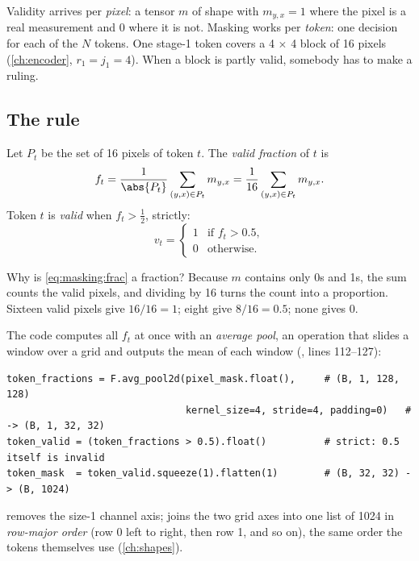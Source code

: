 Validity arrives per \emph{pixel}: a tensor $m$ of shape  with
$m_{y,x} = 1$ where the pixel is a real measurement and $0$ where it is not. Masking works per
\emph{token}: one decision for each of the $N$ tokens. One stage-1 token covers a 4 $\times$ 4 block of
16 pixels (\cref{ch:encoder}, $r_1 = j_1 = 4$). When a block is partly valid, somebody has to make a
ruling.

\subsection{The rule}

\begin{definition}
Let $P_t$ be the set of 16 pixels of token $t$. The \emph{valid fraction} of $t$
is
\begin{equation}\label{eq:masking:frac}
f_t = \frac{1}{\abs{P_t}} \sum_{(y,x) \in P_t} m_{y,x} = \frac{1}{16} \sum_{(y,x) \in P_t} m_{y,x} .
\end{equation}
Token $t$ is \emph{valid} when $f_t > \tfrac12$, strictly:
\begin{equation}\label{eq:masking:valid}
v_t = \begin{cases} 1 & \text{if } f_t > 0.5,\\ 0 & \text{otherwise.}\end{cases}
\end{equation}
\end{definition}

Why is \cref{eq:masking:frac} a fraction? Because $m$ contains only 0s and 1s, the sum counts the
valid pixels, and dividing by 16 turns the count into a proportion. Sixteen valid pixels give $16/16 =
1$; eight give $8/16 = 0.5$; none gives $0$.

The code computes all $f_t$ at once with an \emph{average pool}, an operation
that slides a window over a grid and outputs the mean of each window
(, lines 112--127):
\begin{lstlisting}
token_fractions = F.avg_pool2d(pixel_mask.float(),     # (B, 1, 128, 128)
                               kernel_size=4, stride=4, padding=0)   # -> (B, 1, 32, 32)
token_valid = (token_fractions > 0.5).float()          # strict: 0.5 itself is invalid
token_mask  = token_valid.squeeze(1).flatten(1)        # (B, 32, 32) -> (B, 1024)
\end{lstlisting}
 removes the size-1 channel axis;  joins the two grid axes into one
list of 1024 in \emph{row-major order} (row 0 left to right, then row 1, and so
on), the same order the tokens themselves use (\cref{ch:shapes}).


